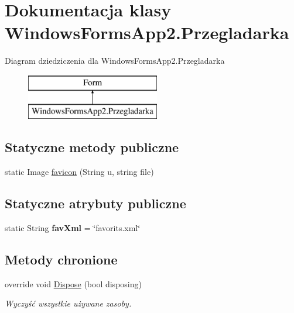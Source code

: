 \hypertarget{class_windows_forms_app2_1_1_przegladarka}{}\section{Dokumentacja klasy Windows\+Forms\+App2.\+Przegladarka}
\label{class_windows_forms_app2_1_1_przegladarka}
Diagram dziedziczenia dla Windows\+Forms\+App2.\+Przegladarka\begin{figure}[H]
\begin{center}
\leavevmode
\includegraphics[height=2.000000cm]{class_windows_forms_app2_1_1_przegladarka}
\end{center}
\end{figure}
\subsection*{Statyczne metody publiczne}
\begin{DoxyCompactItemize}
\item 
static Image \hyperlink{class_windows_forms_app2_1_1_przegladarka_a25874245b07b80396888b5c96bb67251}{favicon} (String u, string file)
\end{DoxyCompactItemize}
\subsection*{Statyczne atrybuty publiczne}
\begin{DoxyCompactItemize}
\item 
\mbox{\label{class_windows_forms_app2_1_1_przegladarka_ab28068e2ce99fd06715ca76c9d1ba6ca}} 
static String {\bfseries fav\+Xml} = \char`\"{}favorits.\+xml\char`\"{}
\end{DoxyCompactItemize}
\subsection*{Metody chronione}
\begin{DoxyCompactItemize}
\item 
override void \hyperlink{class_windows_forms_app2_1_1_przegladarka_a1952e96668e9dae2dd62a80771162925}{Dispose} (bool disposing)
\begin{DoxyCompactList}\small\item\em Wyczyść wszystkie używane zasoby. \end{DoxyCompactList}\end{DoxyCompactItemize}
